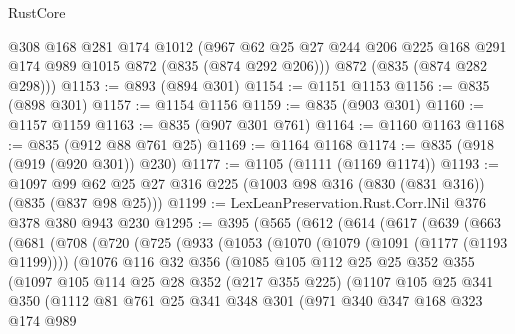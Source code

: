 \begin{lexlean}{RustCore}
\begin{coremodule}
      @308
      @168
      @281
      @174
      @1012
      (@967 @62 @25 @27 @244 @206 @225 @168 @291 @174 @989 @1015 @872 (@835 (@874 @292 @206)))
      @872
      (@835 (@874 @282 @298)))
@1153 := @893 (@894 @301)
@1154 := @1151 @1153
@1156 := @835 (@898 @301)
@1157 := @1154 @1156
@1159 := @835 (@903 @301)
@1160 := @1157 @1159
@1163 := @835 (@907 @301 @761)
@1164 := @1160 @1163
@1168 := @835 (@912 @88 @761 @25)
@1169 := @1164 @1168
@1174 := @835 (@918 (@919 (@920 @301)) @230)
@1177 := @1105 (@1111 (@1169 @1174))
@1193 := @1097 @99 @62 @25 @27 @316 @225 (@1003 @98 @316 (@830 (@831 @316)) (@835 (@837 @98 @25)))
@1199 := LexLeanPreservation.Rust.Corr.lNil @376 @378 @380 @943 @230
@1295 := @395
    (@565
      (@612
        (@614
          (@617
            (@639
              (@663
                (@681
                  (@708
                    (@720
                      (@725
                        (@933
                          (@1053
                            (@1070
                              (@1079 (@1091 (@1177 (@1193 @1199))))
                              (@1076
                                @116
                                @32
                                @356
                                (@1085
                                  @105
                                  @112
                                  @25
                                  @25
                                  @352
                                  @355
                                  (@1097
                                    @105
                                    @114
                                    @25
                                    @28
                                    @352
                                    (@217 @355 @225)
                                    (@1107
                                      @105
                                      @25
                                      @341
                                      @350
                                      (@1112
                                        @81
                                        @761
                                        @25
                                        @341
                                        @348
                                        @301
                                        (@971
                                          @340
                                          @347
                                          @168
                                          @323
                                          @174
                                          @989

\end{coremodule}
\end{lexlean}
